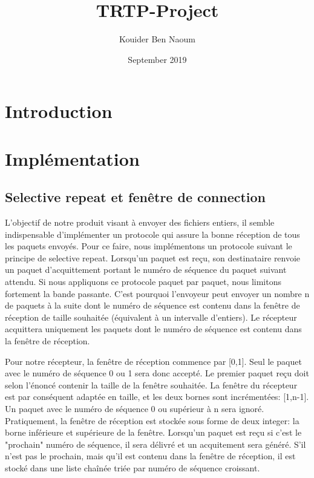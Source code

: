\documentclass{article}
\title{TRTP-Project}
\author{Kouider Ben Naoum}
\date{September 2019}
\begin{document}




\section{Introduction}
\section{Implémentation}
\subsection{Selective repeat et fenêtre de connection}
L'objectif de notre produit visant à envoyer des fichiers entiers, il semble indispensable d'implémenter un protocole qui assure la bonne réception de tous les paquets envoyés. Pour ce faire, nous implémentons un protocole suivant le principe de selective repeat. Lorsqu'un paquet est reçu, son destinataire renvoie un paquet d'acquittement portant le numéro de séquence du paquet suivant attendu. Si nous appliquons ce protocole paquet par paquet, nous limitons fortement la bande passante. C'est pourquoi l'envoyeur peut envoyer un nombre n de paquets à la suite dont le numéro de séquence est contenu dans la fenêtre de réception de taille souhaitée (équivalent à un intervalle d'entiers). Le récepteur acquittera uniquement les paquets dont le numéro de séquence est contenu dans la fenêtre de réception.

Pour notre récepteur, la fenêtre de réception commence par [0,1]. Seul le paquet avec le numéro de séquence 0 ou 1 sera donc accepté. Le premier paquet reçu doit selon l'énoncé contenir la taille de la fenêtre souhaitée. La fenêtre du récepteur est par conséquent adaptée en taille, et les deux bornes sont incrémentées: [1,n-1]. Un paquet avec le numéro de séquence 0 ou supérieur à n sera ignoré. Pratiquement, la fenêtre de réception est stockée sous forme de deux integer: la borne inférieure et supérieure de la fenêtre.
Lorsqu'un paquet est reçu si c'est le "prochain" numéro de séquence, il sera délivré et un acquitement sera généré. S'il n'est pas le prochain, mais qu'il est contenu dans la fenêtre de réception, il est stocké dans une liste chaînée triée par numéro de séquence croissant.
\end{document}
